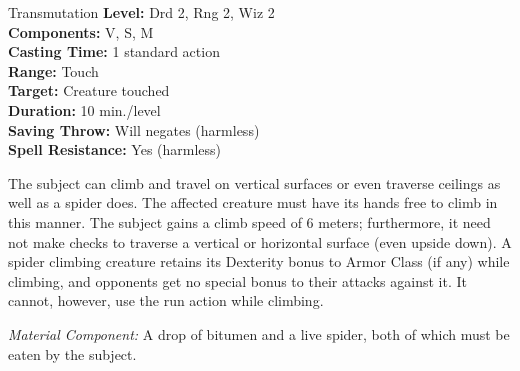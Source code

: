 {Transmutation}
{
	\textbf{Level:}
	Drd 2, Rng 2, Wiz 2\\
	\textbf{Components:}
	V, S, M\\
	\textbf{Casting Time:}
	1 standard action\\
	\textbf{Range:}
	Touch\\
	\textbf{Target:}
	Creature touched\\
	\textbf{Duration:}
	10 min./level\\
	\textbf{Saving Throw:}
	Will negates (harmless)\\
	\textbf{Spell Resistance:}
	Yes (harmless)\\
}
{
	The subject can climb and travel on vertical surfaces or even traverse ceilings as well as a spider does. The affected creature must have its hands free to climb in this manner. The subject gains a climb speed of 6 meters; furthermore, it need not make  checks to traverse a vertical or horizontal surface (even upside down). A spider climbing creature retains its Dexterity bonus to Armor Class (if any) while climbing, and opponents get no special bonus to their attacks against it. It cannot, however, use the run action while climbing.

	\textit{Material Component:}
	A drop of bitumen and a live spider, both of which must be eaten by the subject.

}
